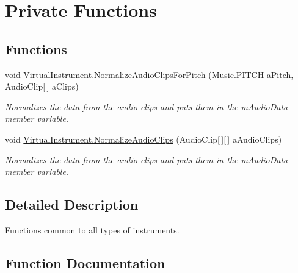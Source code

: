 \hypertarget{group___v_i_base_priv_func}{}\section{Private Functions}
\label{group___v_i_base_priv_func}
\subsection*{Functions}
\begin{DoxyCompactItemize}
\item 
void \hyperlink{group___v_i_base_priv_func_gaecd4f9ead08a03be878b2085055a975c}{Virtual\+Instrument.\+Normalize\+Audio\+Clips\+For\+Pitch} (\hyperlink{group___music_enums_ga508f69b199ea518f935486c990edac1d}{Music.\+P\+I\+T\+CH} a\+Pitch, Audio\+Clip\mbox{[}$\,$\mbox{]} a\+Clips)
\begin{DoxyCompactList}\small\item\em Normalizes the data from the audio clips and puts them in the m\+Audio\+Data member variable. \end{DoxyCompactList}\item 
void \hyperlink{group___v_i_base_priv_func_ga0262de8cfb1e671b01ba76de2e9d140a}{Virtual\+Instrument.\+Normalize\+Audio\+Clips} (Audio\+Clip\mbox{[}$\,$\mbox{]}\mbox{[}$\,$\mbox{]} a\+Audio\+Clips)
\begin{DoxyCompactList}\small\item\em Normalizes the data from the audio clips and puts them in the m\+Audio\+Data member variable. \end{DoxyCompactList}\end{DoxyCompactItemize}


\subsection{Detailed Description}
Functions common to all types of instruments. 

\subsection{Function Documentation}
\mbox{\label{group___v_i_base_priv_func_ga0262de8cfb1e671b01ba76de2e9d140a}} 
